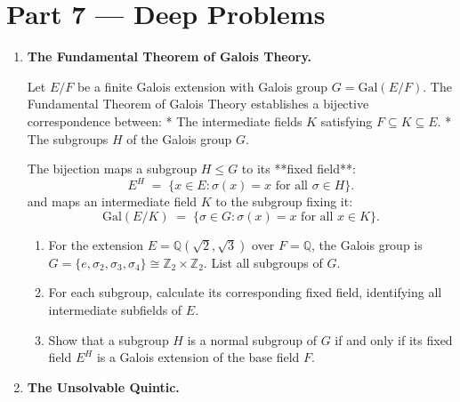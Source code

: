\documentclass[12pt, a4paper]{article}
\begin{document}
\newpage

\section{Part 7 --- Deep Problems}

\begin{enumerate}[label=\textbf{D\arabic*.}]
  \item \textbf{The Fundamental Theorem of Galois Theory.}
  
        Let $E/F$ be a finite Galois extension with Galois group $G = \text{Gal}(E/F)$.
        The Fundamental Theorem of Galois Theory establishes a bijective correspondence between:
        * The intermediate fields $K$ satisfying $F \subseteq K \subseteq E$.
        * The subgroups $H$ of the Galois group $G$.
        
        The bijection maps a subgroup $H \le G$ to its **fixed field**:
        \[
          E^H \;=\; \{x \in E : \sigma(x) = x \text{ for all } \sigma \in H\}.
        \]
        and maps an intermediate field $K$ to the subgroup fixing it:
        \[
          \text{Gal}(E/K) \;=\; \{\sigma \in G : \sigma(x) = x \text{ for all } x \in K\}.
        \]
        
        \begin{enumerate}[label=(\alph*)]
          \item For the extension $E = \mathbb{Q}(\sqrt{2}, \sqrt{3})$ over $F = \mathbb{Q}$, the Galois group is $G = \{e, \sigma_2, \sigma_3, \sigma_4\} \cong \mathbb{Z}_2 \times \mathbb{Z}_2$.
                List all subgroups of $G$.
          \item For each subgroup, calculate its corresponding fixed field, identifying all intermediate subfields of $E$.
          \item Show that a subgroup $H$ is a normal subgroup of $G$ if and only if its fixed field $E^H$ is a Galois extension of the base field $F$.
        \end{enumerate}

  \item \textbf{The Unsolvable Quintic.}
  

\end{enumerate}
\end{document}
